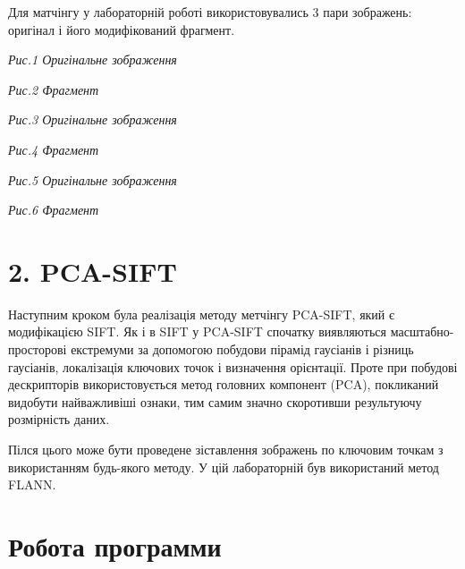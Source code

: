 \documentclass{/home/alx/Documents/LaTex/nulp}
\begin{document}
Для матчінгу у лабораторній роботі використовувались 3 пари зображень: оригінал і його модифікований фрагмент.

\begin{center}

\textit{Рис.1 Оригінальне зображення}
\end{center}

\begin{center}

\textit{Рис.2 Фрагмент}
\end{center}

\begin{center}

\textit{Рис.3 Оригінальне зображення}
\end{center}

\begin{center}

\textit{Рис.4 Фрагмент}
\end{center}

\begin{center}

\textit{Рис.5 Оригінальне зображення}
\end{center}

\begin{center}

\textit{Рис.6 Фрагмент}
\end{center}

\newpage

\section*{2. PCA-SIFT}

Наступним кроком була реалізація методу метчінгу PCA-SIFT, який є модифікацією SIFT. Як і в SIFT у PCA-SIFT спочатку виявляються масштабно-просторові екстремуми за допомогою побудови пірамід гаусіанів і різниць гаусіанів, локалізація ключових точок і визначення орієнтації. Проте при побудові дескрипторів використовується метод головних компонент (PCA), покликаний видобути найважливіші ознаки, тим самим значно скоротивши результуючу розмірність даних.

Пілся цього може бути проведене зіставлення зображень по ключовим точкам з використанням будь-якого методу. У цій лабораторній був використаний метод FLANN.

\section*{Робота программи}
\end{document}
